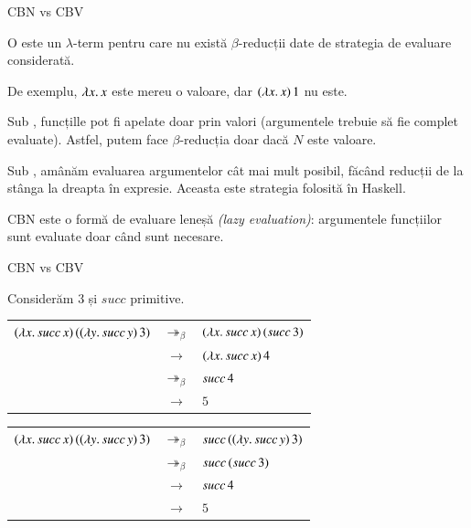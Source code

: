 \documentclass[xcolor=pdftex,romanian,colorlinks]{beamer}
\begin{document}
\begin{frame}[fragile]{CBN vs CBV}

O  este un $\lambda$-term pentru care nu există $\beta$-reducții date de strategia de evaluare considerată.

De exemplu, {\color{True} $\lambda x.\,x$} este mereu o valoare, dar {\color{False} $(\lambda x.\,x)\, 1$} nu este.

Sub , funcțille pot fi apelate doar prin valori (argumentele trebuie să fie complet evaluate). Astfel, putem face $\beta$-reducția  doar dacă $N$ este valoare.

Sub , amânăm evaluarea argumentelor cât mai mult posibil, făcând reducții de la stânga la dreapta în expresie. Aceasta este strategia folosită în Haskell. 

CBN este o formă de evaluare leneșă \textit{(lazy evaluation)}: argumentele funcțiilor sunt evaluate doar când sunt necesare.

\end{frame}

\begin{frame}[fragile]{CBN vs CBV}

\begin{example}
\smallskip
Considerăm $3$ și $succ$ primitive.


\vspace{-.4cm}
\begin{center}
\begin{tabular}{rcl}
$(\lambda x.\,succ\, x)\, ((\lambda y.\,succ\, y)\, 3)$ & $\twoheadrightarrow_\beta$ & $(\lambda x.\,succ\, x)\, (succ\, 3)$ \\
& $\rightarrow$ & $(\lambda x.\,succ\, x)\, 4$ \\
& $\twoheadrightarrow_\beta$ & $succ\, 4$ \\
& $\rightarrow$ &  $5$
\end{tabular}
\end{center} 

\vspace{-.4cm}
\begin{center}
\begin{tabular}{rcl}
$(\lambda x.\,succ\, x)\, ((\lambda y.\,succ\, y)\, 3)$ & $\twoheadrightarrow_\beta$ & $succ\, ((\lambda y.\,succ\, y)\, 3)$ \\
& $\twoheadrightarrow_\beta$ & $succ\, (succ\, 3)$ \\
& $\rightarrow$ & $succ\, 4$ \\
& $\rightarrow$ & $5$ \\
\end{tabular}
\end{center} 
\end{example}

\end{frame}
\end{document}
